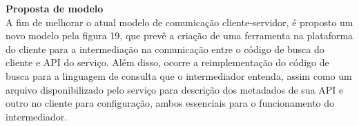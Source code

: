 \textbf{Proposta de modelo} \\

A fim de melhorar o atual modelo de comunicação cliente-servidor, é proposto um novo modelo pela figura 19, que prevê a criação de uma ferramenta na plataforma do cliente para a intermediação na comunicação entre o código de busca do cliente e API do serviço. Além disso, ocorre a reimplementação do código de busca para a linguagem de consulta que o intermediador entenda, assim como um arquivo disponibilizado pelo serviço para descrição dos metadados de sua API e outro no cliente para configuração, ambos essenciais para o funcionamento do intermediador.

\begin{figure}[H]
  \centering
\end{figure}
